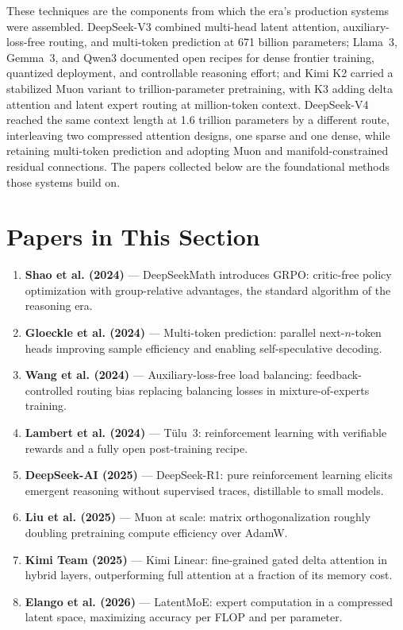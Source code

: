 These techniques are the components from which the era's production systems were assembled. DeepSeek-V3 combined multi-head latent attention, auxiliary-loss-free routing, and multi-token prediction at 671 billion parameters; Llama~3, Gemma~3, and Qwen3 documented open recipes for dense frontier training, quantized deployment, and controllable reasoning effort; and Kimi K2 carried a stabilized Muon variant to trillion-parameter pretraining, with K3 adding delta attention and latent expert routing at million-token context. DeepSeek-V4 reached the same context length at 1.6 trillion parameters by a different route, interleaving two compressed attention designs, one sparse and one dense, while retaining multi-token prediction and adopting Muon and manifold-constrained residual connections. The papers collected below are the foundational methods those systems build on.

\section*{Papers in This Section}

\begin{enumerate}
\item \textbf{Shao et al. (2024)} --- DeepSeekMath introduces GRPO: critic-free policy optimization with group-relative advantages, the standard algorithm of the reasoning era.

\item \textbf{Gloeckle et al. (2024)} --- Multi-token prediction: parallel next-$n$-token heads improving sample efficiency and enabling self-speculative decoding.

\item \textbf{Wang et al. (2024)} --- Auxiliary-loss-free load balancing: feedback-controlled routing bias replacing balancing losses in mixture-of-experts training.

\item \textbf{Lambert et al. (2024)} --- T\"ulu~3: reinforcement learning with verifiable rewards and a fully open post-training recipe.

\item \textbf{DeepSeek-AI (2025)} --- DeepSeek-R1: pure reinforcement learning elicits emergent reasoning without supervised traces, distillable to small models.

\item \textbf{Liu et al. (2025)} --- Muon at scale: matrix orthogonalization roughly doubling pretraining compute efficiency over AdamW.

\item \textbf{Kimi Team (2025)} --- Kimi Linear: fine-grained gated delta attention in hybrid layers, outperforming full attention at a fraction of its memory cost.

\item \textbf{Elango et al. (2026)} --- LatentMoE: expert computation in a compressed latent space, maximizing accuracy per FLOP and per parameter.
\end{enumerate}
